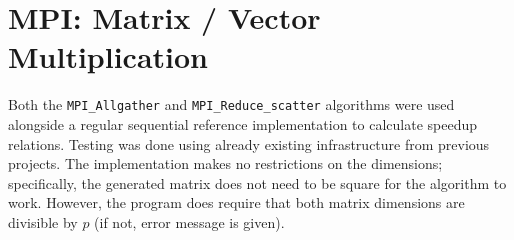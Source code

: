 \documentclass[11pt]{article}
\begin{document}
\newpage
\section{MPI: Matrix / Vector Multiplication}
Both the \verb=MPI_Allgather= and \verb=MPI_Reduce_scatter= algorithms were used alongside a regular sequential reference implementation to calculate speedup relations. Testing was done using already existing infrastructure from previous projects. The implementation makes no restrictions on the dimensions; specifically, the generated matrix does not need to be square for the algorithm to work. However, the program does require that both matrix dimensions are divisible by $p$ (if not, error message is given).
\end{document}
